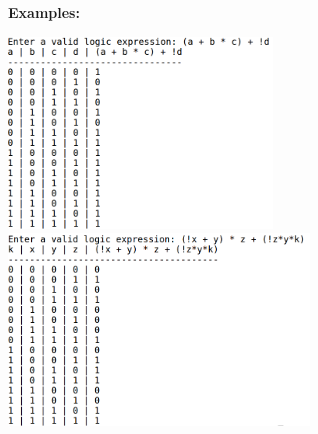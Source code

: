 \documentclass{article}
\begin{document}
      \vspace{3em}
      \centerline{\textbf{Examples:}}
      \vspace{2em}

      \includegraphics[width=7cm]{ex3a.png}\hfill
      \includegraphics[width=8cm]{ex3b.png}
\end{document}
